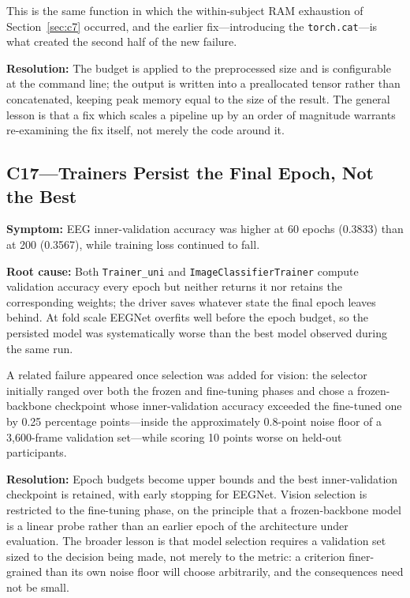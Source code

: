 This is the same function in which the within-subject RAM exhaustion of
Section~\ref{sec:c7} occurred, and the earlier fix---introducing the
\texttt{torch.cat}---is what created the second half of the new failure.

\textbf{Resolution:} The budget is applied to the preprocessed size and is
configurable at the command line; the output is written into a preallocated tensor
rather than concatenated, keeping peak memory equal to the size of the result. The
general lesson is that a fix which scales a pipeline up by an order of magnitude
warrants re-examining the fix itself, not merely the code around it.

\subsection*{C17---Trainers Persist the Final Epoch, Not the Best}

\textbf{Symptom:} EEG inner-validation accuracy was higher at 60 epochs (0.3833) than
at 200 (0.3567), while training loss continued to fall.

\textbf{Root cause:} Both \texttt{Trainer\_uni} and \texttt{ImageClassifierTrainer}
compute validation accuracy every epoch but neither returns it nor retains the
corresponding weights; the driver saves whatever state the final epoch leaves behind.
At fold scale EEGNet overfits well before the epoch budget, so the persisted model was
systematically worse than the best model observed during the same run.

A related failure appeared once selection was added for vision: the selector initially
ranged over both the frozen and fine-tuning phases and chose a frozen-backbone
checkpoint whose inner-validation accuracy exceeded the fine-tuned one by 0.25
percentage points---inside the approximately 0.8-point noise floor of a 3,600-frame
validation set---while scoring 10 points worse on held-out participants.

\textbf{Resolution:} Epoch budgets become upper bounds and the best
inner-validation checkpoint is retained, with early stopping for EEGNet. Vision
selection is restricted to the fine-tuning phase, on the principle that a
frozen-backbone model is a linear probe rather than an earlier epoch of the
architecture under evaluation. The broader lesson is that model selection requires a
validation set sized to the decision being made, not merely to the metric: a criterion
finer-grained than its own noise floor will choose arbitrarily, and the consequences
need not be small.

